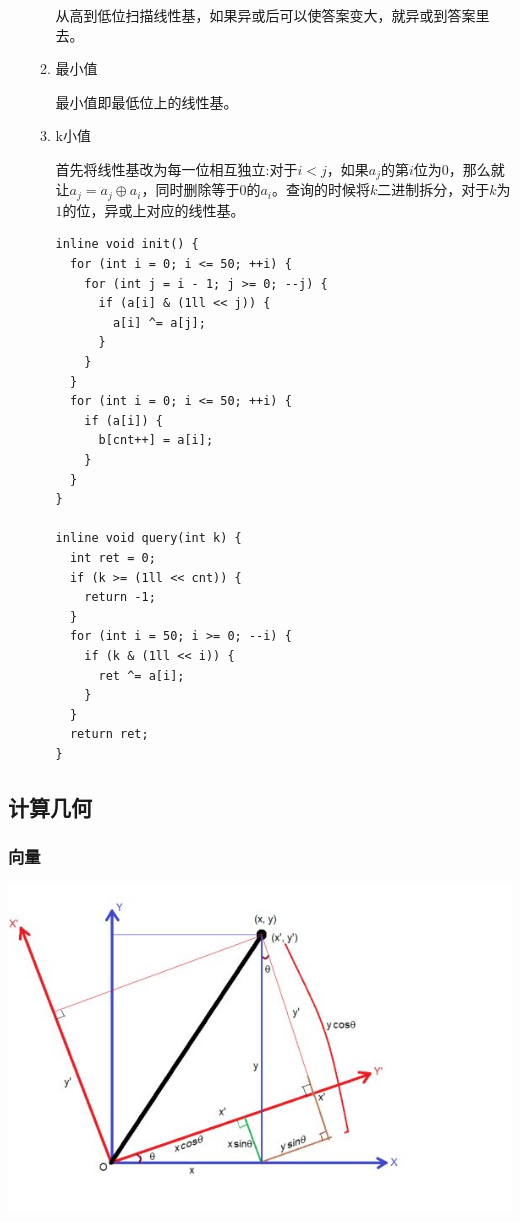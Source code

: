 \documentclass[11pt]{article}
\begin{document}
\begin{enumerate}
\begin{enumerate}
从高到低位扫描线性基，如果异或后可以使答案变大，就异或到答案里去。

\item 最小值
\label{sec-1-2-2-3-5}

最小值即最低位上的线性基。

\item k小值
\label{sec-1-2-2-3-6}

首先将线性基改为每一位相互独立:对于\(i < j\)，如果\(a_j\)的第\(i\)位为\(0\)，那么就让\(a_j=a_j \oplus a_i\)，同时删除等于\(0\)的\(a_i\)。查询的时候将\(k\)二进制拆分，对于\(k\)为\(1\)的位，异或上对应的线性基。

\begin{verbatim}
inline void init() {
  for (int i = 0; i <= 50; ++i) {
    for (int j = i - 1; j >= 0; --j) {
      if (a[i] & (1ll << j)) {
        a[i] ^= a[j];
      }
    }
  }
  for (int i = 0; i <= 50; ++i) {
    if (a[i]) {
      b[cnt++] = a[i];
    }
  }
}

inline void query(int k) {
  int ret = 0;
  if (k >= (1ll << cnt)) {
    return -1;
  }
  for (int i = 50; i >= 0; --i) {
    if (k & (1ll << i)) {
      ret ^= a[i];
    }
  }
  return ret;
}
\end{verbatim}
\end{enumerate}
\end{enumerate}
\subsection{计算几何}
\label{sec-1-3}
\subsubsection{向量}
\label{sec-1-3-1}

\includegraphics[width=.9\linewidth]{./Source/Picture/vector.png}
\end{document}
